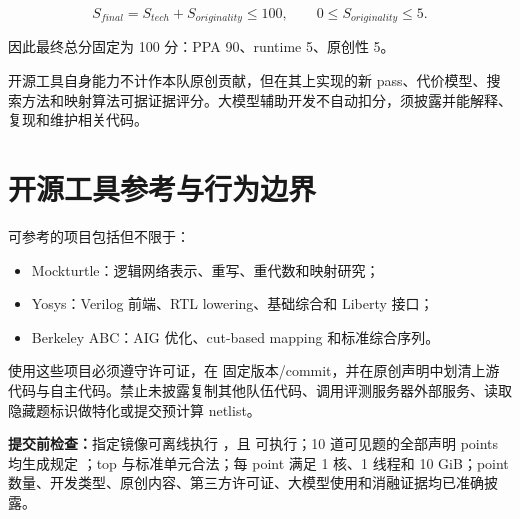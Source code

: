 \documentclass[UTF8,a4paper,11pt,fontset=fandol]{ctexart}
\begin{document}
\[
S_{final}=S_{tech}+S_{originality}\leq100,\qquad 0\leq S_{originality}\leq5.
\]

因此最终总分固定为 100 分：PPA 90、runtime 5、原创性 5。

开源工具自身能力不计作本队原创贡献，但在其上实现的新 pass、代价模型、搜索方法和映射算法可据证据评分。大模型辅助开发不自动扣分，须披露并能解释、复现和维护相关代码。

\section{开源工具参考与行为边界}

可参考的项目包括但不限于：

\begin{itemize}
  \item Mockturtle：逻辑网络表示、重写、重代数和映射研究；
  \item Yosys：Verilog 前端、RTL lowering、基础综合和 Liberty 接口；
  \item Berkeley ABC：AIG 优化、cut-based mapping 和标准综合序列。
\end{itemize}

使用这些项目必须遵守许可证，在  固定版本/commit，并在原创声明中划清上游代码与自主代码。禁止未披露复制其他队伍代码、调用评测服务器外部服务、读取隐藏题标识做特化或提交预计算 netlist。

\begin{noticebox}
{\small\textbf{提交前检查：}指定镜像可离线执行 ，且  可执行；10 道可见题的全部声明 points 均生成规定 ；top 与标准单元合法；每 point 满足 1 核、1 线程和 10 GiB；point 数量、开发类型、原创内容、第三方许可证、大模型使用和消融证据均已准确披露。}
\end{noticebox}
\end{document}
